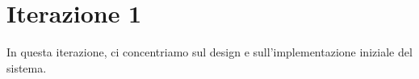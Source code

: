 \documentclass{softwaredoc}
\begin{document}
\newpage
\section{Iterazione 1}
In questa iterazione, ci concentriamo sul design e sull'implementazione iniziale del sistema.


\newpage

\newpage

\end{document}
